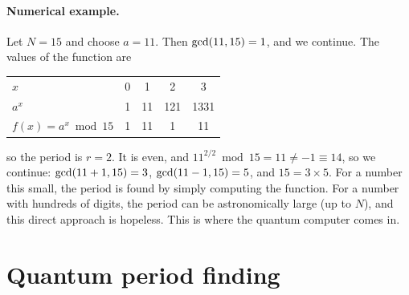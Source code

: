 \paragraph{Numerical example.} Let $N=15$ and choose $a=11$. Then $\operatorname{gcd}(11,15)=1$, and we continue. The values of the function are
\begin{center}
\begin{tabular}{@{}lcccc@{}}\toprule
$x$ & 0&1&2&3\\ $a^x$ & 1&11&121&1331\\ $f(x)=a^x\bmod15$ & 1&11&1&11\\ \bottomrule
\end{tabular}
\end{center}
so the period is $r=2$. It is even, and $11^{2/2}\bmod15=11\neq-1\equiv14$, so we continue: $\operatorname{gcd}(11+1,15)=3$, $\operatorname{gcd}(11-1,15)=5$, and $15=3\times5$. For a number this small, the period is found by simply computing
the function. For a number with hundreds of digits, the period can be astronomically large (up to $N$), and this direct approach is hopeless. This is where the quantum computer comes in.

\section{Quantum period finding}
